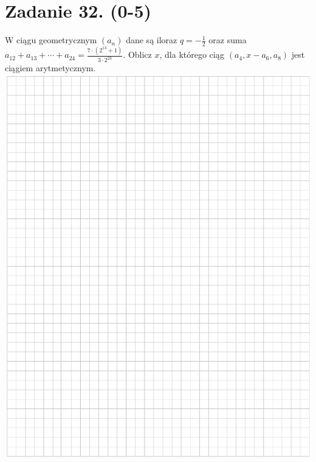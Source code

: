\documentclass[10pt]{article}
\begin{document}
\section*{Zadanie 32. (0-5)}
W ciągu geometrycznym \(\left(a_{n}\right)\) dane są iloraz \(q=-\frac{1}{2}\) oraz suma \(a_{12}+a_{13}+\cdots+a_{24}=\frac{7 \cdot\left(2^{13}+1\right)}{3 \cdot 2^{23}}\). Oblicz \(x\), dla którego ciąg \(\left(a_{4}, x-a_{6}, a_{8}\right)\) jest ciągiem arytmetycznym.\\
\includegraphics[max width=\textwidth, center]{2024_11_21_94f02db55673a8a7b820g-18}
\end{document}
